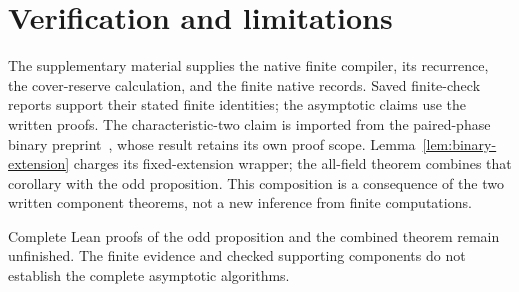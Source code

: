 \documentclass[11pt]{article}
\theoremstyle{definition}
\begin{document}
\section{Verification and limitations}
The supplementary material supplies the native finite compiler,
its recurrence, the cover-reserve calculation, and the finite native
records. Saved finite-check reports support their stated finite
identities; the asymptotic claims use the written proofs. The
characteristic-two claim is imported from the paired-phase binary
preprint~\cite{PairedPhase}, whose result retains its own proof scope.
Lemma~\ref{lem:binary-extension} charges its fixed-extension wrapper;
the all-field theorem combines that corollary with the odd proposition.
This composition is a consequence of the two written component
theorems, not a new inference from finite computations.

Complete Lean proofs of the odd proposition and the combined theorem
remain unfinished. The finite evidence and checked supporting components
do not establish the complete asymptotic algorithms.

\appendix

\end{document}
